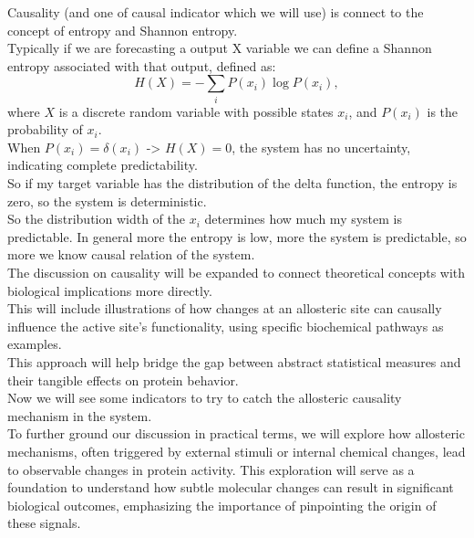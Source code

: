 \documentclass[English, Lau, oneside]{sapthesis}
\begin{document}
Causality (and one of causal indicator which we will use) is connect to the concept of entropy and Shannon entropy.\\
Typically if we are forecasting a output X variable we can define a Shannon entropy associated with that output, defined as:
\[
H(X) = -\sum_{i} P(x_i) \log P(x_i),
\]
where \( X \) is a discrete random variable with possible states \( x_i \), and \( P(x_i) \) is the probability of \( x_i \).\\
When \( P(x_i) = \delta(x_i) \) -> \( H(X) = 0 \), the system has no uncertainty, indicating complete predictability.\\
So if my target variable has the distribution of the delta function, the entropy is zero, so the system is deterministic.\\
So the distribution width of the \( x_i \) determines how much my system is predictable.
In general more the entropy is low, more the system is predictable, so more we know causal relation of the system.\\
The discussion on causality will be expanded to connect theoretical concepts with biological implications more directly.\\
This will include illustrations of how changes at an allosteric site can causally influence the active site's functionality, using specific biochemical pathways as examples.\\
This approach will help bridge the gap between abstract statistical measures and their tangible effects on protein behavior.\\
Now we will see some indicators to try to catch the allosteric causality mechanism in the system.\\
To further ground our discussion in practical terms, we will explore how allosteric mechanisms, often triggered by external stimuli or internal chemical changes, lead to observable changes in protein activity. This exploration will serve as a foundation to understand how subtle molecular changes can result in significant biological outcomes, emphasizing the importance of pinpointing the origin of these signals.


\newpage
\end{document}
